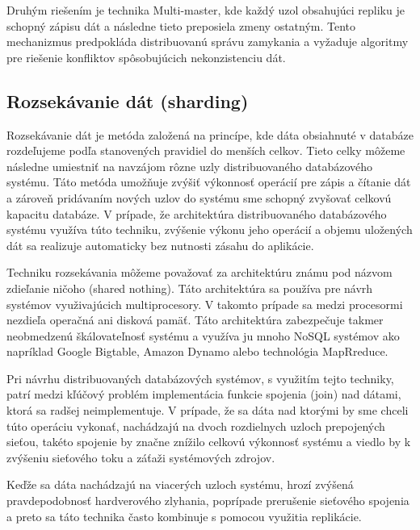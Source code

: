 \documentclass[11pt,twoside,a4paper]{book}
\begin{document}
Druhým riešením je technika Multi-master, kde každý uzol obsahujúci repliku je schopný zápisu dát a následne tieto preposiela zmeny ostatným. Tento mechanizmus predpokláda distribuovanú správu zamykania a vyžaduje algoritmy pre riešenie konfliktov spôsobujúcich nekonzistenciu dát.


\subsection{Rozsekávanie dát (sharding)}

Rozsekávanie dát je metóda založená na princípe, kde dáta obsiahnuté v databáze rozdeľujeme podľa stanovených pravidiel do menších celkov. Tieto celky môžeme následne umiestniť na navzájom rôzne uzly distribuovaného databázového systému. Táto metóda umožňuje zvýšiť výkonnosť operácií pre zápis a čítanie dát a zároveň pridávaním nových uzlov do systému sme schopný zvyšovať celkovú kapacitu databáze. V prípade, že architektúra distribuovaného databázového systému využíva túto techniku, zvýšenie výkonu jeho operácií a objemu uložených dát sa realizuje automaticky bez nutnosti zásahu do aplikácie. 

Techniku rozsekávania môžeme považovať za architektúru známu pod názvom zdieľanie ničoho \cite{sharedNothing} (shared nothing). Táto architektúra sa používa pre návrh systémov využivajúcich multiprocesory. V takomto prípade sa medzi procesormi nezdieľa operačná ani disková pamäť. Táto architektúra zabezpečuje takmer neobmedzenú škálovateľnosť systému a využíva ju mnoho NoSQL systémov ako napríklad Google Bigtable, Amazon Dynamo alebo technológia MapRreduce.

Pri návrhu distribuovaných databázových systémov, s využitím tejto techniky, patrí medzi kľúčový problém implementácia funkcie spojenia (join) nad dátami, ktorá sa radšej neimplementuje. V prípade, že sa dáta nad ktorými by sme chceli túto operáciu vykonať, nachádzajú na dvoch rozdielnych uzloch prepojených sieťou, takéto spojenie by značne znížilo celkovú výkonnosť systému a viedlo by k zvýšeniu sieťového toku a záťaži systémových zdrojov. 

Keďže sa dáta nachádzajú na viacerých uzloch systému, hrozí zvýšená pravdepodobnosť hardverového zlyhania, poprípade prerušenie sieťového spojenia a preto sa táto technika často kombinuje s pomocou využitia replikácie.
\end{document}
